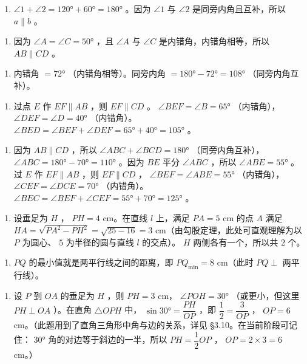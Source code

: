 \begin{answer}


\begin{enumerate}
  \item $\angle 1 + \angle 2 = 120° + 60° = 180°$ 。因为 $\angle 1$ 与 $\angle 2$ 是同旁内角且互补，所以 $a \parallel b$ 。
\end{enumerate}


\begin{enumerate}
  \item 因为 $\angle A = \angle C = 50°$ ，且 $\angle A$ 与 $\angle C$ 是内错角，内错角相等，所以 $AB \parallel CD$ 。
\end{enumerate}


\begin{enumerate}
  \item 内错角 $= 72°$ （内错角相等）。同旁内角 $= 180° - 72° = 108°$ （同旁内角互补）。
\end{enumerate}


\begin{enumerate}
  \item 过点 $E$ 作 $EF \parallel AB$ ，则 $EF \parallel CD$ 。 $\angle BEF = \angle B = 65°$ （内错角）， $\angle DEF = \angle D = 40°$ （内错角）。 $\angle BED = \angle BEF + \angle DEF = 65° + 40° = 105°$ 。
\end{enumerate}


\begin{enumerate}
  \item 因为 $AB \parallel CD$ ，所以 $\angle ABC + \angle BCD = 180°$ （同旁内角互补）， $\angle ABC = 180° - 70° = 110°$ 。因为 $BE$ 平分 $\angle ABC$ ，所以 $\angle ABE = 55°$ 。过 $E$ 作 $EF \parallel AB$ ，则 $EF \parallel CD$ ， $\angle BEF = \angle ABE = 55°$ （内错角）， $\angle CEF = \angle DCE = 70°$ （内错角）。 $\angle BEC = \angle BEF + \angle CEF = 55° + 70° = 125°$ 。
\end{enumerate}


\begin{enumerate}
  \item 设垂足为 $H$ ， $PH = 4$ cm。在直线 $l$ 上，满足 $PA = 5$ cm 的点 $A$ 满足 $HA = \sqrt{PA^2 - PH^2} = \sqrt{25 - 16} = 3$ cm（由勾股定理，此处可直观理解为以 $P$ 为圆心、 $5$ 为半径的圆与直线 $l$ 的交点）。 $H$ 两侧各有一个，所以共 $2$ 个。
\end{enumerate}


\begin{enumerate}
  \item $PQ$ 的最小值就是两平行线之间的距离，即 $PQ_{\min} = 8$ cm（此时 $PQ \perp$ 两平行线）。
\end{enumerate}


\begin{enumerate}
  \item 设 $P$ 到 $OA$ 的垂足为 $H$ ，则 $PH = 3$ cm， $\angle POH = 30°$ （或更小，但这里 $PH \perp OA$ ）。在直角 $\triangle OPH$ 中， $\sin 30° = \dfrac{PH}{OP}$ ，即 $\dfrac{1}{2} = \dfrac{3}{OP}$ ， $OP = 6$ cm。（此题用到了直角三角形中角与边的关系，详见 §3.10。在当前阶段可记住： $30°$ 角的对边等于斜边的一半，所以 $PH = \dfrac{1}{2} OP$ ， $OP = 2 \times 3 = 6$ cm。）
\end{enumerate}


\end{answer}

